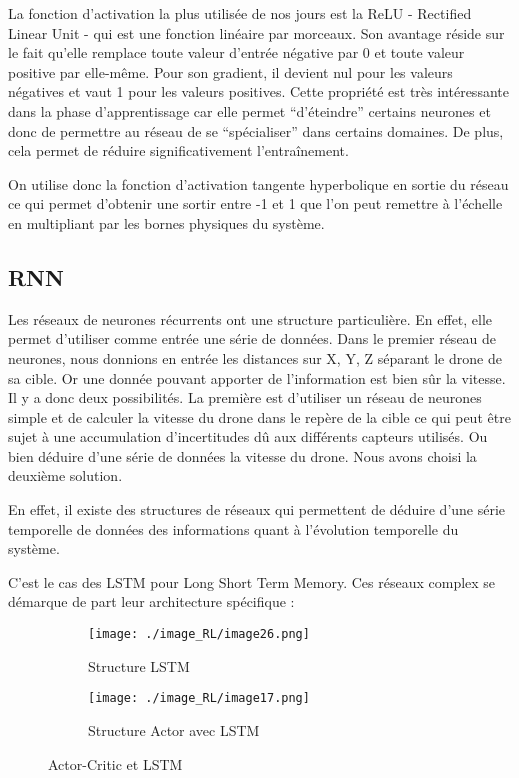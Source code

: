 La fonction d'activation la plus utilisée de nos jours est la ReLU - Rectified Linear Unit - qui est une fonction linéaire par morceaux. Son avantage réside sur le fait qu'elle remplace toute valeur d'entrée négative par 0 et toute valeur positive par elle-même. Pour son gradient, il devient nul pour les valeurs négatives et vaut 1 pour les valeurs positives. Cette propriété est très intéressante dans la phase d'apprentissage car elle permet “d’éteindre” certains neurones et donc de permettre au réseau de se “spécialiser” dans certains domaines. De plus, cela permet de réduire significativement l'entraînement.


On utilise donc la fonction d’activation tangente hyperbolique en sortie du réseau ce qui permet d’obtenir une sortir entre -1 et 1 que l’on peut remettre à l'échelle en multipliant par les bornes physiques du système.

\subsection{RNN}

Les réseaux de neurones récurrents ont une structure particulière. En effet, elle permet d’utiliser comme entrée une série de données. Dans le premier réseau de neurones, nous donnions en entrée les distances sur X, Y, Z séparant le drone de sa cible.
Or une donnée pouvant apporter de l’information est bien sûr la vitesse.
Il y a donc deux possibilités. La première est d'utiliser un réseau de neurones simple et de calculer la vitesse du drone dans le repère de la cible ce qui peut être sujet à une accumulation d’incertitudes dû aux différents capteurs utilisés.
Ou bien déduire d’une série de données la vitesse du drone.
Nous avons choisi la deuxième solution. 

En effet, il existe des structures de réseaux qui permettent de déduire d’une série temporelle de données des informations quant à l’évolution temporelle du système.

C’est le cas des LSTM pour Long Short Term Memory. Ces réseaux complex se démarque de part leur architecture spécifique :

\begin{figure}[H]
    \centering
        \begin{subfigure}[b]{0.45\textwidth}
            \centering
            \texttt{[image: ./image\_RL/image26.png]}
            \caption{Structure LSTM}
        \end{subfigure}
        \hfill
        \begin{subfigure}[b]{0.45\textwidth}
            \centering
            \texttt{[image: ./image\_RL/image17.png]}
            \caption{Structure Actor avec LSTM}
        \end{subfigure}
        \caption{Actor-Critic et LSTM}
\end{figure}

